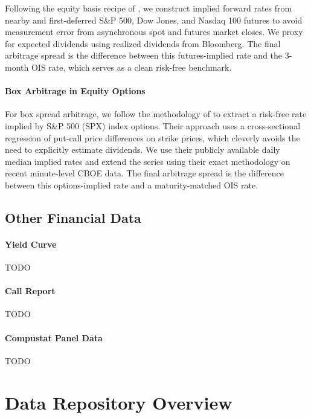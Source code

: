 \documentclass{article}
\begin{document}
Following the equity basis recipe of \citet{Hazelkorn2023}, we construct implied forward rates from nearby and first-deferred S\&P 500, Dow Jones, and Nasdaq 100 futures to avoid measurement error from asynchronous spot and futures market closes. We proxy for expected dividends using realized dividends from Bloomberg. The final arbitrage spread is the difference between this futures-implied rate and the 3-month OIS rate, which serves as a clean risk-free benchmark.

\paragraph{Box Arbitrage in Equity Options}
For box spread arbitrage, we follow the methodology of \citet{VanBinsbergen2022} to extract a risk-free rate implied by S\&P 500 (SPX) index options. Their approach uses a cross-sectional regression of put-call price differences on strike prices, which cleverly avoids the need to explicitly estimate dividends. We use their publicly available daily median implied rates and extend the series using their exact methodology on recent minute-level CBOE data. The final arbitrage spread is the difference between this options-implied rate and a maturity-matched OIS rate.

\subsection{Other Financial Data}

\paragraph{Yield Curve}
TODO

\paragraph{Call Report}
TODO

\paragraph{Compustat Panel Data}
TODO




\section{Data Repository Overview}
\label{sec:repository_overview}

\end{document}
